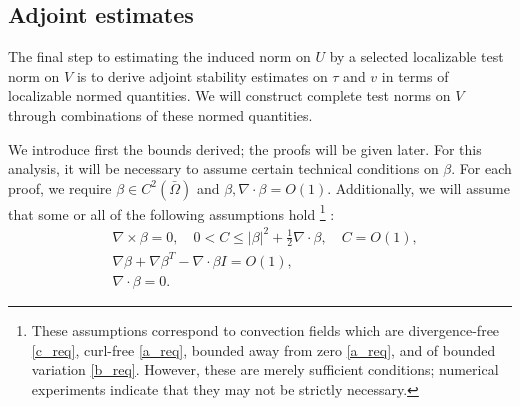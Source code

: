 \documentclass[11pt,onecolumn]{scrartcl}
\newcommand{\grad}{\nabla}
\newcommand{\curl}{\grad \times}
\renewcommand{\div}{\grad \cdot}
\begin{document}

\subsection{Adjoint estimates}
\label{sec:strategy3}

The final step to estimating the induced norm on $U$ by a selected localizable test norm on $V$ is to derive adjoint stability estimates on $\tau$ and $v$ in terms of localizable normed quantities.  We will construct complete test norms on $V$ through combinations of these normed quantities.%

We introduce first the bounds derived; the proofs will be given later. For this analysis, it will be necessary to assume certain technical conditions on $\beta$.  For each proof, we require $\beta \in C^2(\bar{\Omega})$ and $\beta, \div \beta = O(1)$.  Additionally, we will assume that some or all of the following assumptions hold
\footnote{These assumptions correspond to convection fields which are divergence-free \eqref{c_req}, curl-free \eqref{a_req}, bounded away from zero \eqref{a_req}, and of bounded variation \eqref{b_req}.  However, these are merely sufficient conditions; numerical experiments indicate that they may not be strictly necessary.}
:
\begin{align}
&\curl \beta = 0, \quad 0<C \leq \left | \beta\right |^2 + \frac{1}{2}\div \beta, \quad C = O(1) \label{a_req},\\
&\grad \beta + \grad \beta ^T - \div \beta I = O(1) \label{b_req},\\
&\div \beta = 0 \label{c_req}.
\end{align}
\end{document}

